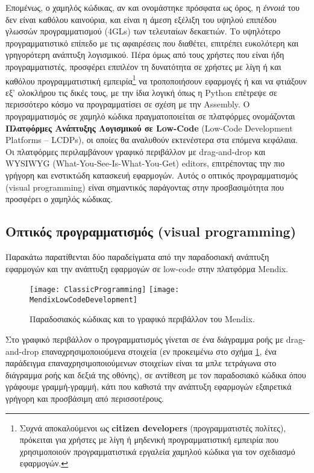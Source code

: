         Επομένως, ο χαμηλός κώδικας, αν και ονομάστηκε πρόσφατα ως όρος, η \textit{έννοιά} του δεν είναι καθόλου καινούρια, και είναι η άμεση εξέλιξη του υψηλού επιπέδου γλωσσών προγραμματισμού (4GLs) των τελευταίων δεκαετιών. Το υψηλότερο προγραμματιστικό επίπεδο με τις αφαιρέσεις που διαθέτει, επιτρέπει ευκολότερη και γρηγορότερη ανάπτυξη λογισμικού. Πέρα όμως από τους χρήστες που είναι ήδη προγραμματιστές, προσφέρει επιπλέον τη δυνατότητα σε χρήστες με λίγη ή και καθόλου προγραμματιστική εμπειρία\footnote{Συχνά αποκαλούμενοι ως \textbf{citizen developers} (προγραμματιστές πολίτες), πρόκειται για χρήστες με λίγη ή μηδενική προγραμματιστική εμπειρία που χρησιμοποιούν προγραμματιστικά εργαλεία χαμηλού κώδικα για τον σχεδιασμό εφαρμογών.} να τροποποιήσουν εφαρμογές ή και να φτιάξουν εξ' ολοκλήρου τις δικές τους, με την ίδια λογική όπως η Python επέτρεψε σε περισσότερο κόσμο να προγραμματίσει σε σχέση με την Assembly. Ο προγραμματισμός σε χαμηλό κώδικα πραγματοποιείται σε πλατφόρμες ονομάζονται \textbf{Πλατφόρμες Ανάπτυξης Λογισμικού σε Low-Code} (Low-Code Development Platforms -- LCDPs), οι οποίες θα αναλυθούν εκτενέστερα στα επόμενα κεφάλαια. Οι πλατφόρμες περιλαμβάνουν γραφικό περιβάλλον με drag-and-drop και WYSIWYG (What-You-See-Is-What-You-Get) editors, επιτρέποντας την πιο γρήγορη και ενστικτώδη κατασκευή εφαρμογών. Αυτός ο οπτικός προγραμματισμός (visual programming) είναι σημαντικός παράγοντας στην προσβασιμότητα που προσφέρει ο χαμηλός κώδικας. \cite{LowCodeMendix} \cite{LowCodeSimon} \cite{LowCodeDemocratization}

            \subsection{Οπτικός προγραμματισμός (visual programming)}
            Παρακάτω παρατίθενται δύο παραδείγματα από την παραδοσιακή ανάπτυξη εφαρμογών και την ανάπτυξη εφαρμογών σε low-code στην πλατφόρμα Mendix.

            \begin{figure}[H] \noindent \centering
                    \texttt{[image: ClassicProgramming]}
                    \texttt{[image: MendixLowCodeDevelopment]}
                    \caption{Παραδοσιακός κώδικας και το γραφικό περιβάλλον του Mendix.}
                    \label{fig:codevsmendix}
            \end{figure}

            Στο γραφικό περιβάλλον ο προγραμματισμός γίνεται σε ένα διάγραμμα ροής με drag-and-drop επαναχρησιμοποιούμενα στοιχεία (εν προκειμένω στο σχήμα \ref{fig:codevsmendix}, ένα παράδειγμα επαναχρησιμοποιούμενων στοιχείων είναι τα μπλε τετράγωνα στο διάγραμμα ροής και δεξιά της οθόνης), σε αντίθεση με τον παραδοσιακό κώδικα όπου γράφουμε γραμμή-γραμμή, κάτι που καθιστά την ανάπτυξη εφαρμογών εξαιρετικά γρήγορη και προσβάσιμη από περισσοτέρους.

